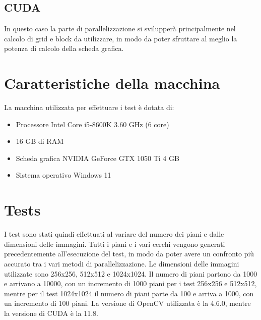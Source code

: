 \documentclass[11pt]{article}
\begin{document}
    \subsection{CUDA}\label{subsec:cuda}
    In questo caso la parte di parallelizzazione si svilupperà principalmente nel calcolo di grid e block da utilizzare,
    in modo da poter sfruttare al meglio la potenza di calcolo della scheda grafica.
    

    \section{Caratteristiche della macchina}\label{sec:caratteristiche-della-macchina}
    La macchina utilizzata per effettuare i test è dotata di:
    \begin{itemize}
        \item Processore Intel Core i5-8600K 3.60 GHz (6 core)
        \item 16 GB di RAM
        \item Scheda grafica NVIDIA GeForce GTX 1050 Ti 4 GB
        \item Sistema operativo Windows 11
    \end{itemize}

    \section{Tests}\label{sec:tests}
    I test sono stati quindi effettuati al variare del numero dei piani e dalle dimensioni delle immagini.
    Tutti i piani e i vari cerchi vengono generati precedentemente all'esecuzione del test, in modo da poter avere
    un confronto più accurato tra i vari metodi di parallelizzazione.
    Le dimensioni delle immagini utilizzate sono 256x256, 512x512 e 1024x1024.
    Il numero di piani partono da 1000 e arrivano a 10000, con un incremento di 1000 piani per i test 256x256 e 512x512,
    mentre per il test 1024x1024 il numero di piani parte da 100 e arriva a 1000, con un incremento di 100 piani.
    La versione di OpenCV utilizzata è la 4.6.0, mentre la versione di CUDA è la 11.8.
\end{document}
